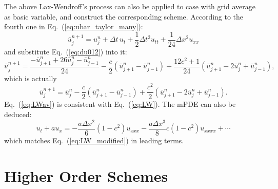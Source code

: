 \documentclass[]{article}
\begin{document}
The above Lax-Wendroff's process can also be applied to case with grid
average as basic variable, and construct the corresponding scheme.
According to the fourth one in Eq.~(\ref{eq:ubar_taylor_many}):
\[
\bar u_{j}^{n+1}  = u_j^n+\Delta t\, u_t + \frac{1}{2}\Delta t^2
u_{tt} + \frac{1}{24} \Delta x^2 u_{xx}
\]
and substitute Eq.~(\ref{eq:du012}) into it:
\[
\bar u_j^{n+1}  = \frac{-\bar u_{j+1}^n + 26\bar u_j^n - \bar u_{j-1}^n}{24}-
\frac{c}{2}\left(\bar u_{j+1}^n-\bar u_{j-1}^n\right) +
\frac{12c^2+1}{24}\left(\bar u_{j+1}^n-2\bar u_j^n+\bar
u_{j-1}^n\right),
\]
which is actually
\begin{equation}
\bar u_j^{n+1} = \bar u_j^n -\frac{c}{2}\left(\bar u_{j+1}^n-\bar u_{j-1}^n\right) +
\frac{c^2}{2}\left(\bar u_{j+1}^n-2\bar u_j^n+\bar u_{j-1}^n\right).
\label{eq:LWav}
\end{equation}
Eq.~(\ref{eq:LWav}) is consistent with Eq.~(\ref{eq:LW}). The
mPDE can also be deduced:
\begin{equation*}
u_t+au_x=-\frac{a\Delta x^2}{6}(1-c^2)u_{xxx} -\frac{a\Delta x^3}{8}c(1-c^2)u_{xxxx}+\cdots
\end{equation*}
which matches Eq.~(\ref{eq:LW_modified}) in leading terms.




\section{Higher Order Schemes}\label{sec:higher-order-schemes}
\end{document}
